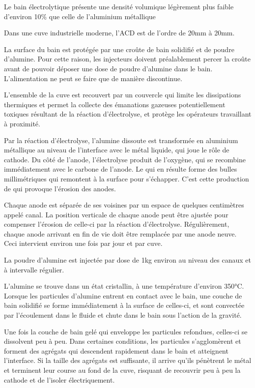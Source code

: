 Le bain électrolytique présente une densité volumique légèrement plus
faible d'environ \num{10}\% que celle de l'aluminium métallique


Dans une cuve industrielle moderne, l'ACD est de
l'ordre de \num{20}\si{\milli\meter} à \num{20}\si{\milli\meter}.

La surface du bain est protégée par une croûte
de bain solidifié et de poudre d'alumine. Pour cette raison, les
injecteurs doivent préalablement percer la croûte avant de pouvoir
déposer une dose de poudre d'alumine dans le bain. L'alimentation ne
peut se faire que de manière discontinue.

L'ensemble de la cuve est
recouvert par un couvercle qui limite les dissipations thermiques et
permet la collecte des émanations gazeuses potentiellement toxiques
résultant de la réaction d'électrolyse, et protège les opérateurs
travaillant à proximité.

Par la réaction d'électrolyse, l'alumine dissoute est transformée en
aluminium métallique au niveau de l'interface avec le métal liquide,
qui joue le rôle de cathode. Du côté de l'anode, l'électrolyse produit
de l'oxygène, qui se recombine immédiatement avec le carbone de
l'anode. Le  qui en résulte forme des bulles
millimétriques qui remontent à la surface pour s'échapper. C'est cette
production de  qui provoque l'érosion des anodes.


 Chaque anode est
séparée de ses voisines par un espace de quelques centimètres appelé
canal. La position verticale de chaque anode peut être ajustée pour
compenser l'érosion de celle-ci par la réaction
d'électrolyse. Régulièrement, chaque anode arrivant en fin de vie doit
être remplacée par une anode neuve. Ceci intervient environ une fois
par jour et par cuve.

La poudre d'alumine est injectée par dose de \num{1}\si{\kilo\gram}
environ au niveau des canaux et à intervalle régulier.

L'alumine se trouve dans un état cristallin, à une température
d'environ \num{350}\si{\celsius}. Lorsque les particules d'alumine
entrent en contact avec le bain, une couche de bain solidifié se
forme immédiatement à la surface de celles-ci, et sont convectée par
l'écoulement dans le fluide et chute dans le bain sous l'action de
la gravité.

Une fois la couche de bain gelé qui enveloppe les particules
refondues, celles-ci se dissolvent peu à peu. Dans certaines
conditions, les particules s'agglomèrent et forment des agrégats
qui descendent rapidement dans le bain et atteignent l'interface. Si
la taille des agrégats est suffisante, il arrive qu'ils pénètrent
le métal et terminent leur course au fond de la cuve, risquant de
recouvrir peu à peu la cathode et de l'isoler électriquement.

